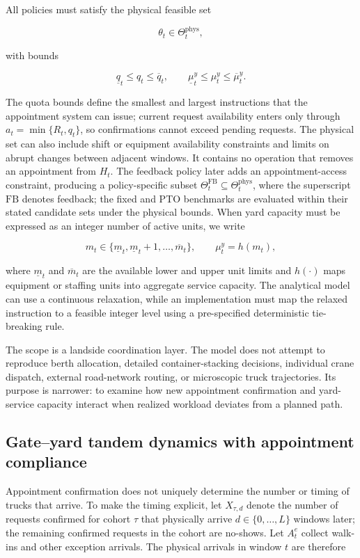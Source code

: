 \documentclass[preprint,12pt,authoryear,a4paper]{elsarticle}
\begin{document}
All policies must satisfy the physical feasible set

\[
\theta_t\in\Theta_t^{\mathrm{phys}},
\]

with bounds

\[
\underline q_t\le q_t\le\overline q_t,
\qquad
\underline\mu_t^y\le\mu_t^y\le\overline\mu_t^y.
\]

The quota bounds define the smallest and largest instructions that the appointment system can issue; current request availability enters only through \(a_t=\min\{R_t,q_t\}\), so confirmations cannot exceed pending requests. The physical set can also include shift or equipment availability constraints and limits on abrupt changes between adjacent windows. It contains no operation that removes an appointment from \(H_t\). The feedback policy later adds an appointment-access constraint, producing a policy-specific subset \(\Theta_t^{\mathrm{FB}}\subseteq\Theta_t^{\mathrm{phys}}\), where the superscript \(\mathrm{FB}\) denotes feedback; the fixed and PTO benchmarks are evaluated within their stated candidate sets under the physical bounds. When yard capacity must be expressed as an integer number of active units, we write

\[
m_t\in\{\underline m_t,\underline m_t+1,\ldots,\overline m_t\},
\qquad
\mu_t^y=h(m_t),
\]

where \(\underline m_t\) and \(\overline m_t\) are the available lower and upper unit limits and \(h(\cdot)\) maps equipment or staffing units into aggregate service capacity. The analytical model can use a continuous relaxation, while an implementation must map the relaxed instruction to a feasible integer level using a pre-specified deterministic tie-breaking rule.

The scope is a landside coordination layer. The model does not attempt to reproduce berth allocation, detailed container-stacking decisions, individual crane dispatch, external road-network routing, or microscopic truck trajectories. Its purpose is narrower: to examine how new appointment confirmation and yard-service capacity interact when realized workload deviates from a planned path.

\subsection{Gate--yard tandem dynamics with appointment compliance}
\label{subsec:3-2-gate-yard-tandem-dynamics-with-appointment-compliance}

Appointment confirmation does not uniquely determine the number or timing of trucks that arrive. To make the timing explicit, let \(X_{\tau,d}\) denote the number of requests confirmed for cohort \(\tau\) that physically arrive \(d\in\{0,\ldots,L\}\) windows later; the remaining confirmed requests in the cohort are no-shows. Let \(A_t^e\) collect walk-ins and other exception arrivals. The physical arrivals in window \(t\) are therefore
\end{document}
